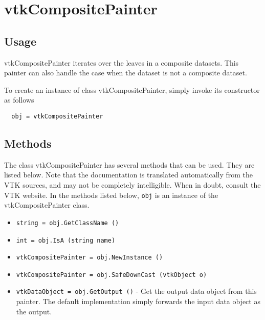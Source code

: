 \section{vtkCompositePainter}

\subsection{Usage}

 vtkCompositePainter iterates over the leaves in a composite datasets.
 This painter can also handle the case when the dataset is not a composite
 dataset.

To create an instance of class vtkCompositePainter, simply
invoke its constructor as follows
\begin{verbatim}
  obj = vtkCompositePainter
\end{verbatim}
\subsection{Methods}

The class vtkCompositePainter has several methods that can be used.
  They are listed below.
Note that the documentation is translated automatically from the VTK sources,
and may not be completely intelligible.  When in doubt, consult the VTK website.
In the methods listed below, \verb|obj| is an instance of the vtkCompositePainter class.
\begin{itemize}
\item  \verb|string = obj.GetClassName ()|

\item  \verb|int = obj.IsA (string name)|

\item  \verb|vtkCompositePainter = obj.NewInstance ()|

\item  \verb|vtkCompositePainter = obj.SafeDownCast (vtkObject o)|

\item  \verb|vtkDataObject = obj.GetOutput ()| -  Get the output data object from this painter. The default implementation
 simply forwards the input data object as the output.

\end{itemize}
